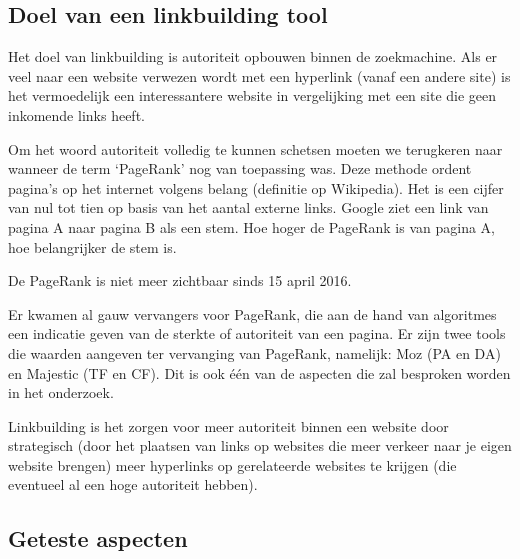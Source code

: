 \subsection{Doel van een linkbuilding tool}
\label{ch: Doel van een linkbuilding tool}

Het doel van linkbuilding is autoriteit opbouwen binnen de zoekmachine. Als er veel naar een website verwezen wordt met een hyperlink (vanaf een andere site) is het vermoedelijk een interessantere website in vergelijking met een site die geen inkomende links heeft. 

Om het woord autoriteit volledig te kunnen schetsen moeten we terugkeren naar wanneer de term ‘PageRank’ nog van toepassing was. Deze methode ordent pagina’s op het internet volgens belang (definitie op Wikipedia). Het is een cijfer van nul tot tien op basis van het aantal externe links. Google ziet een link van pagina A naar pagina B als een stem. Hoe hoger de PageRank is van pagina A, hoe belangrijker de stem is. 

De PageRank is niet meer zichtbaar sinds 15 april 2016. 

Er kwamen al gauw vervangers voor PageRank, die aan de hand van algoritmes een indicatie geven van de sterkte of autoriteit van een pagina. Er zijn twee tools die waarden aangeven ter vervanging van PageRank, namelijk: Moz (PA en DA) en Majestic (TF en CF). Dit is ook één van de aspecten die zal besproken worden in het onderzoek. 

Linkbuilding is het zorgen voor meer autoriteit binnen een website door strategisch (door het plaatsen van links op websites die meer verkeer naar je eigen website brengen) meer hyperlinks op gerelateerde websites te krijgen (die eventueel al een hoge autoriteit hebben).

\subsection{Geteste aspecten}
\label{ch: Geteste aspecten}

